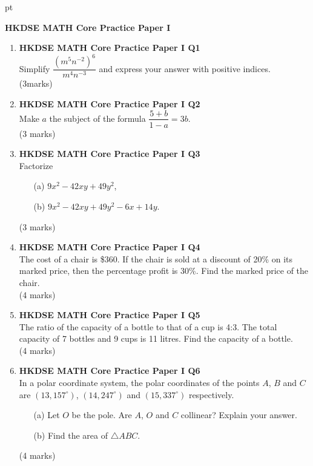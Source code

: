 \documentclass[12pt]{article}
\begin{document}
 pt
\begin{center}
	{\large \bf HKDSE MATH Core Practice Paper I}\\
	\vspace{2 mm}
\end{center}
\vspace{0.05cm}

\begin{enumerate}
	\item \textbf{HKDSE MATH Core Practice Paper I Q1}\\
	Simplify $\dfrac{(m^5n^{-2})^6}{m^4n^{-3}}$ and express your answer with positive indices. \\(3marks)

	\item \textbf{HKDSE MATH Core Practice Paper I Q2}\\
	Make $a$ the subject of the formula $\dfrac{5 + b}{1 - a} = 3b$. \\(3 marks)

	\item \textbf{HKDSE MATH Core Practice Paper I Q3}\\
	Factorize 
	\begin{enumerate}
		\item[(a)] $9x^2 - 42xy + 49y^2$,
		\item[(b)] $9x^2 - 42xy + 49y^2 - 6x + 14y$.
	\end{enumerate}
	(3 marks)

	\item \textbf{HKDSE MATH Core Practice Paper I Q4}\\
	The cost of a chair is \$360. If the chair is sold at a discount of 20\% on its marked price, then the percentage profit is 30\%. Find the marked price of the chair. \\(4 marks)
	
	\item \textbf{HKDSE MATH Core Practice Paper I Q5}\\
	The ratio of the capacity of a bottle to that of a cup is 4:3. The total capacity of 7 bottles and 9 cups is 11 litres. Find the capacity of a bottle. \\(4 marks)
	
	\item \textbf{HKDSE MATH Core Practice Paper I Q6}\\
	In a polar coordinate system, the polar coordinates of the points $A$, $B$ and $C$ are $(13, 157^\circ)$, $(14, 247^\circ)$ and $(15, 337^\circ)$ respectively.
	\begin{enumerate}
		\item[(a)] Let $O$ be the pole. Are $A$, $O$ and $C$ collinear? Explain your answer.
		\item[(b)] Find the area of $\triangle ABC$.
	\end{enumerate}
	(4 marks)


\end{enumerate}
\end{document}
